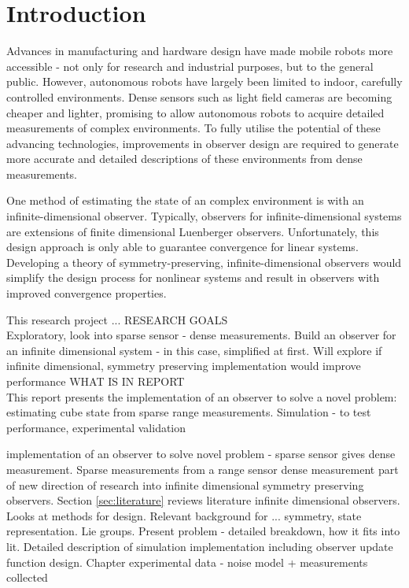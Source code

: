 \chapter{Introduction}

Advances in manufacturing and hardware design have made mobile robots more accessible - not only for research and industrial purposes, but to the general public. However, autonomous robots have largely been limited to indoor, carefully controlled environments. Dense sensors such as light field cameras are becoming cheaper and lighter, promising to allow autonomous robots to acquire detailed measurements of complex environments. To fully utilise the potential of these advancing technologies,  improvements in observer design are required to generate more accurate and detailed descriptions of these environments from dense measurements.

One method of estimating the state of an complex environment is with an infinite-dimensional observer. Typically, observers for infinite-dimensional systems are extensions of finite dimensional Luenberger observers. Unfortunately, this design approach is only able to guarantee convergence for linear systems. Developing a theory of symmetry-preserving, infinite-dimensional observers would simplify the design process for nonlinear systems and result in observers with improved convergence properties.

This research project ...
RESEARCH GOALS\\
	Exploratory, look into sparse sensor - dense measurements. Build an observer for an infinite dimensional system - in this case, simplified at first. Will explore if infinite dimensional, symmetry preserving implementation would improve performance
WHAT IS IN REPORT\\
	This report presents the implementation of an observer to solve a novel problem: estimating cube state from sparse range measurements.
	Simulation - to test performance, experimental validation
	
	implementation of an observer to solve novel problem - sparse sensor gives dense measurement.
	Sparse measurements from a range sensor
	dense measurement part of new direction of research into infinite dimensional symmetry preserving observers.
	Section \ref{sec:literature} reviews literature infinite dimensional observers. Looks at methods for design.
	Relevant background for ... symmetry, state representation. Lie groups. 
	Present problem - detailed breakdown, how it fits into lit. 
	Detailed description of simulation implementation including observer update function design.
	Chapter 
	experimental data - noise model + measurements collected


